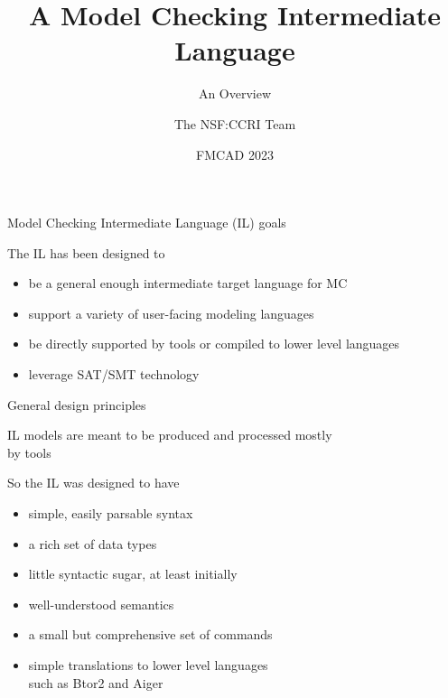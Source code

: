 \documentclass[10pt,aspectratio=149]{beamer}
\title{
{\LARGE A Model Checking Intermediate Language}
\\[1ex]
}
\subtitle{\Large An Overview}
\author{\large The NSF:CCRI Team}
\date{FMCAD 2023}
\begin{document}


\begin{frame}
\titlepage

\end{frame}


\begin{frame}{Model Checking Intermediate Language (IL)  goals}
\large 

The IL has been designed to
\bigskip

\begin{itemize}
\item
be a \alert{general enough} intermediate \alert{target language} for MC
\medskip

\item
support a \alert{variety} of user-facing \alert{modeling languages}
\medskip

\item
be \alert{directly supported} by tools or \alert{compiled} to lower level languages
\medskip

\item
leverage SAT/SMT technology
\end{itemize}


\end{frame}


\begin{frame}{General design principles}
\large

IL models are meant to be \alert{produced and processed} mostly \\
\alert{by tools}
\bigskip
\medskip
\pause

So the IL was designed to have
\medskip


\begin{itemize}
\item<2,8> \alert{simple}, easily parsable \alert{syntax}
\item<3,8> a \alert{rich set} of \alert{data types}
\item<4,8> little syntactic sugar, at least initially
\item<5,8> \alert{well-understood semantics}
\item<6,8> a \alert{small} but comprehensive \alert{set of commands}
\item<7-> \alert{simple translations to lower level} languages \\
      such as Btor2 and Aiger
\end{itemize}


\end{frame}
\end{document}
